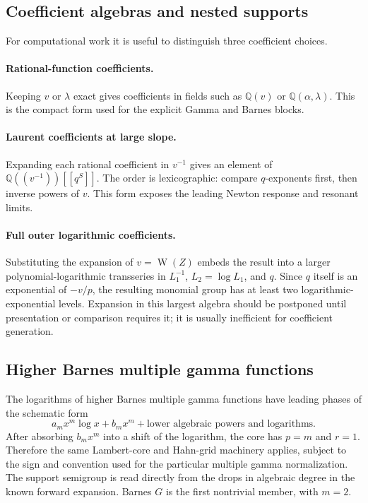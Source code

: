 \documentclass[11pt,oneside]{article}
\theoremstyle{plain}
\theoremstyle{definition}
\theoremstyle{remark}
\newcommand{\W}{\operatorname{W}}
\newcommand{\Q}{\mathbb{Q}}
\begin{document}
\subsection{Coefficient algebras and nested supports}

For computational work it is useful to distinguish three coefficient choices.

\paragraph{Rational-function coefficients.}
Keeping \(v\) or \(\lambda\) exact gives coefficients in fields such as
\(\Q(v)\) or \(\Q(\alpha,\lambda)\).  This is the compact form used for the
explicit Gamma and Barnes blocks.

\paragraph{Laurent coefficients at large slope.}
Expanding each rational coefficient in \(v^{-1}\) gives an element of
\(\Q((v^{-1}))[[q^S]]\).  The order is lexicographic: compare \(q\)-exponents
first, then inverse powers of \(v\).  This form exposes the leading Newton
response and resonant limits.

\paragraph{Full outer logarithmic coefficients.}
Substituting the expansion of \(v=\W(Z)\) embeds the result into a larger
polynomial-logarithmic transseries in \(L_1^{-1}\), \(L_2=\log L_1\), and
\(q\).  Since \(q\) itself is an exponential of \(-v/p\), the resulting
monomial group has at least two logarithmic-exponential levels.  Expansion in
this largest algebra should be postponed until presentation or comparison
requires it; it is usually inefficient for coefficient generation.

\subsection{Higher Barnes multiple gamma functions}

The logarithms of higher Barnes multiple gamma functions have leading phases
of the schematic form
\begin{equation}
 a_m x^m\log x+b_mx^m+\text{lower algebraic powers and logarithms}.
 \label{eq:multiple-gamma-schematic}
\end{equation}
After absorbing \(b_mx^m\) into a shift of the logarithm, the core has
\(p=m\) and \(r=1\).  Therefore the same Lambert-core and Hahn-grid machinery
applies, subject to the sign and convention used for the particular multiple
gamma normalization.  The support semigroup is read directly from the drops
in algebraic degree in the known forward expansion.  Barnes \(G\) is the
first nontrivial member, with \(m=2\).
\end{document}
